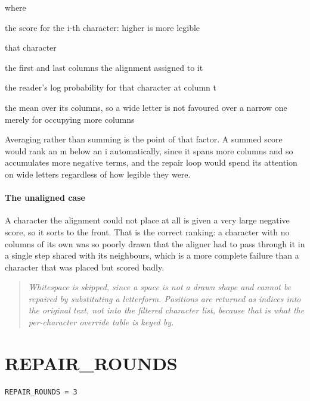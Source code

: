 \noindent where
\begin{description}[leftmargin=2.4em,style=nextline,font=\normalfont\ttfamily]\setlength\itemsep{1pt}
  \item[{$s_i$}] \normalfont the score for the i-th character: higher is more legible
  \item[{$c_i$}] \normalfont that character
  \item[{$t_0,\, t_1$}] \normalfont the first and last columns the alignment assigned to it
  \item[{$\log p_t(c_i)$}] \normalfont the reader's log probability for that character at column t
  \item[{$\frac{1}{t_1-t_0}$}] \normalfont the mean over its columns, so a wide letter is not favoured over a narrow one merely for occupying more columns
\end{description}
Averaging rather than summing is the point of that factor. A summed score would rank an m below an i automatically, since it spans more columns and so accumulates more negative terms, and the repair loop would spend its attention on wide letters regardless of how legible they were.


\paragraph{The unaligned case}
A character the alignment could not place at all is given a very large negative score, so it sorts to the front. That is the correct ranking: a character with no columns of its own was so poorly drawn that the aligner had to pass through it in a single step shared with its neighbours, which is a more complete failure than a character that was placed but scored badly.


\begin{quote}\small\itshape Whitespace is skipped, since a space is not a drawn shape and cannot be repaired by substituting a letterform. Positions are returned as indices into the original text, not into the filtered character list, because that is what the per-character override table is keyed by.\end{quote}

\section{REPAIR\_ROUNDS}
\begin{lstlisting}[style=sig]
REPAIR_ROUNDS = 3
\end{lstlisting}

